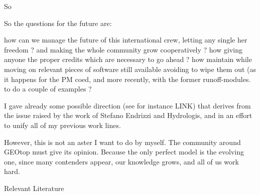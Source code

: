 So

So the questions for the future are: 

how can we manage the future of this international crew, letting any single her freedom ?
and making the whole community grow cooperatively ?
how giving anyone the proper credits which are necessary to go ahead ?
how maintain while moving on relevant pieces of software still available avoiding to wipe them out (as it happens for the PM coed, and more recently, with the former runoff-modules. to do a couple of examples ?

I gave already some possible direction (see for instance LINK) that derives from the issue raised by the work of Stefano Endrizzi and Hydrologis, and in an effort to unify all of my previous work lines.

However, this is not an aster I want to do by myself. The community around GEOtop must give its opinion. Because the only perfect model is the evolving one, since many contenders appear, our knowledge grows, and all of us work hard. 

Relevant Literature 
